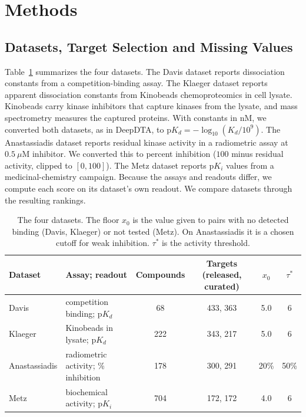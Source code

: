 \section{Methods}
\label{sec:methods}

\subsection{Datasets, Target Selection and Missing Values}
\label{sec:methods:data}

Table~\ref{tab:datasets} summarizes the four datasets. The Davis
dataset\cite{Davis2011} reports dissociation constants from a
competition-binding assay. The Klaeger dataset\cite{Klaeger2017} reports
apparent dissociation constants from Kinobeads chemoproteomics in cell lysate.
Kinobeads carry kinase inhibitors that capture kinases from the lysate, and
mass spectrometry measures the captured proteins. With constants in nM, we
converted both datasets, as in DeepDTA\cite{DeepDTA}, to
$\mathrm{p}K_d = -\log_{10}(K_d / 10^9)$. The
Anastassiadis dataset\cite{Anastassiadis2011} reports residual kinase activity
in a radiometric assay at $0.5~\mu$M inhibitor. We converted this to percent
inhibition ($100$ minus residual activity, clipped to $[0, 100]$). The Metz
dataset\cite{Metz2011} reports $\mathrm{p}K_i$ values from a
medicinal-chemistry campaign. Because the assays and readouts differ, we
compute each score on its dataset's own readout. We compare datasets through
the resulting rankings.

\begin{table}[h]
  \centering
  \caption{The four datasets. The floor $x_0$ is the value given to pairs with
           no detected binding (Davis, Klaeger) or not tested (Metz). On
           Anastassiadis it is a chosen cutoff for weak inhibition.
           $\tau^*$ is the activity threshold.}
  \label{tab:datasets}
  \footnotesize
  \setlength{\tabcolsep}{3pt}
  \begin{tabular}{llcccc}
    \toprule
    Dataset & Assay; readout & Compounds & Targets (released, curated) & $x_0$ & $\tau^*$ \\
    \midrule
    Davis         & competition binding; $\mathrm{p}K_d$  & 68  & 433, 363 & 5.0    & 6 \\
    Klaeger       & Kinobeads in lysate; $\mathrm{p}K_d$  & 222 & 343, 217 & 5.0    & 6 \\
    Anastassiadis & radiometric activity; \% inhibition  & 178 & 300, 291 & 20\%   & 50\% \\
    Metz          & biochemical activity; $\mathrm{p}K_i$ & 704 & 172, 172 & 4.0    & 6 \\
    \bottomrule
  \end{tabular}
\end{table}

